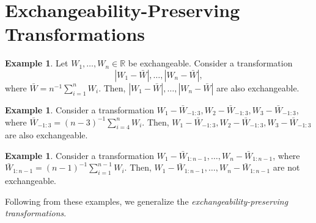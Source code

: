 \documentclass[a4paper,12pt]{article}
\numberwithin{equation}{section}
\theoremstyle{plain}
\theoremstyle{definition}
\newtheorem{example}[theorem]{Example}
\theoremstyle{remark}
\begin{document}
\section{Exchangeability-Preserving Transformations}

\begin{example}
\label{example:ch8-12}
    Let $W_1,\dots,W_n\in\mathbb{R}$ be exchangeable. Consider a transformation
    \[
        \left|W_1-\bar{W}\right|,\dots,\left|W_n-\bar{W}\right|,
    \]
    where $\bar{W}=n^{-1}\sum_{i=1}^{n}W_i$. Then, $\left|W_1-\bar{W}\right|,\allowbreak\dots,\allowbreak\left|W_n-\bar{W}\right|$ are also exchangeable. 
\end{example}

\begin{example}
\label{example:ch8-13}
    Consider a transformation $W_1-\bar{W}_{-1:3},W_2-\bar{W}_{-1:3},W_3-\bar{W}_{-1:3}$, where $\bar{W}_{-1:3}=(n-3)^{-1}\sum_{i=4}^{n}W_i$. Then, $W_1-\bar{W}_{-1:3},W_2-\bar{W}_{-1:3},W_3-\bar{W}_{-1:3}$ are also exchangeable.
\end{example}

\begin{example}
\label{example:ch8-14}
    Consider a transformation $W_1-\bar{W}_{1:n-1},\dots,W_n-\bar{W}_{1:n-1}$, where $\bar{W}_{1:n-1}=(n-1)^{-1}\sum_{i=1}^{n-1}W_i$. Then, $W_1-\bar{W}_{1:n-1},\dots,W_n-\bar{W}_{1:n-1}$ are not exchangeable.
\end{example}

Following from these examples, we generalize the \emph{exchangeability-preserving transformations}.
\end{document}
